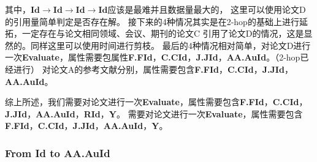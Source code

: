 \documentclass[hyperref,UTF8]{ctexart}
\theoremstyle{definition}
\theoremstyle{remark}
\numberwithin{equation}{subsection}
\newcommand{\Emph}{\textbf}
\newcommand{\Evaluate}{\Emph{Evaluate}}
\newcommand{\Id}{\Emph{Id}}
\newcommand{\RId}{\Emph{RId}}
\newcommand{\FFId}{\Emph{F.FId}}
\newcommand{\CCId}{\Emph{C.CId}}
\newcommand{\JJId}{\Emph{J.JId}}
\newcommand{\AAAuId}{\Emph{AA.AuId}}
\begin{document}
\begin{enumerate}[(1)]
		其中，$\Id \rightarrow \Id \rightarrow \Id \rightarrow \Id$应该是最难并且数据量最大的，
		这里可以使用论文D的引用量简单判定是否存在解。
		接下来的4种情况其实是在2-hop的基础上进行延拓，一定存在与论文相同领域、会议、期刊的论文C
		引用了论文D的情况，这是显然的。同样这里可以使用时间进行剪枝。
		最后的4种情况相对简单，对论文D进行一次\Evaluate，属性需要包属性\FFId，\CCId，\JJId，\AAAuId。（2-hop已经进行）
		对论文A的参考文献分别，属性需要包含\FFId，\CCId，\JJId，\AAAuId。
		
	\end{enumerate}
	
	综上所述，我们需要对论文进行一次\Evaluate，属性需要包含\FFId，\CCId，\JJId，\AAAuId，\RId，\Emph{Y}。
	需要对论文进行一次\Evaluate，属性需要包含\FFId，\CCId，\JJId，\AAAuId，\Emph{Y}。
	
\subsubsection{From \Emph{Id} to \Emph{AA.AuId}}
\label{subsub:Id2AAAuId}
\end{document}
